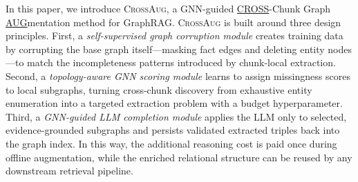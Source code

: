 \documentclass[11pt]{article}
\newcommand{\ours}{\textsc{CrossAug}\xspace}
\begin{document}


In this paper, we introduce \ours, a GNN-guided \underline{CROSS}-Chunk Graph \underline{AUG}mentation method for GraphRAG. \ours is built around three design principles. First, a \textit{self-supervised graph corruption module} creates training data by corrupting the base graph itself---masking fact edges and deleting entity nodes---to match the incompleteness patterns introduced by chunk-local extraction. Second, a \textit{topology-aware GNN scoring module} learns to assign missingness scores to local subgraphs, turning cross-chunk discovery from exhaustive entity enumeration into a targeted extraction problem with a budget hyperparameter. Third, a \textit{GNN-guided LLM completion module} applies the LLM only to selected, evidence-grounded subgraphs and persists validated extracted triples back into the graph index. In this way, the additional reasoning cost is paid once during offline augmentation, while the enriched relational structure can be reused by any downstream retrieval pipeline.
\end{document}
